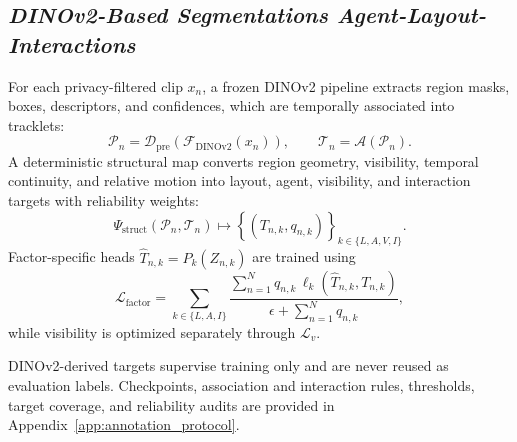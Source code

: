\subsection{\textbf{\emph{DINOv2-Based Segmentations Agent-Layout-Interactions}}}
\label{sec:factor_target_construction}

For each privacy-filtered clip $x_n$, a frozen DINOv2 pipeline
\cite{oquab2024dinov2} extracts region masks, boxes, descriptors, and
confidences, which are temporally associated into tracklets:
\[
\mathcal P_n
=
\mathcal D_{\mathrm{pre}}
\!\left(\mathcal F_{\mathrm{DINOv2}}(x_n)\right),
\qquad
\mathcal T_n=\mathcal A(\mathcal P_n).
\]
A deterministic structural map converts region geometry, visibility, temporal
continuity, and relative motion into layout, agent, visibility, and interaction
targets with reliability weights:
\[
\Psi_{\mathrm{struct}}(\mathcal P_n,\mathcal T_n)
\longmapsto
\left\{(T_{n,k},q_{n,k})\right\}_{k\in\{L,A,V,I\}} .
\]
Factor-specific heads $\widehat T_{n,k}=P_k(Z_{n,k})$ are trained using
\[
\mathcal L_{\mathrm{factor}}
=
\sum_{k\in\{L,A,I\}}
\frac{
\sum_{n=1}^{N} q_{n,k}\,
\ell_k(\widehat T_{n,k},T_{n,k})
}{
\epsilon+\sum_{n=1}^{N}q_{n,k}
},
\]
while visibility is optimized separately through $\mathcal L_v$.

DINOv2-derived targets supervise training only and are never reused as
evaluation labels. Checkpoints, association and interaction rules, thresholds,
target coverage, and reliability audits are provided in
Appendix~\ref{app:annotation_protocol}.









